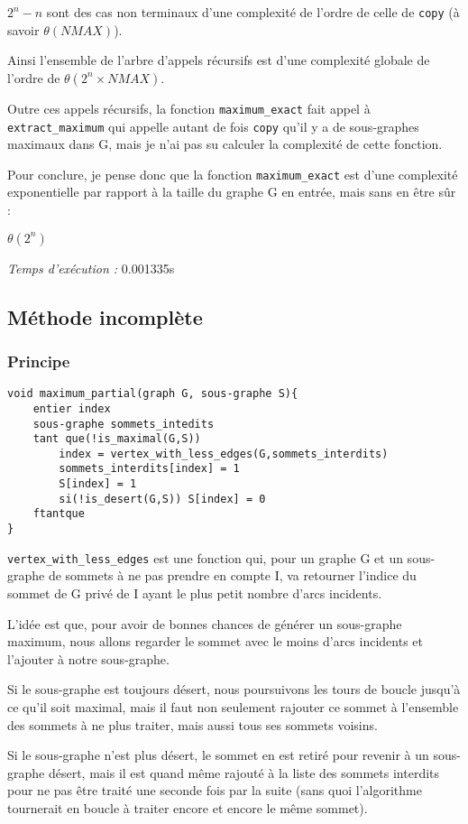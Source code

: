 $2^n-n$ sont des cas non terminaux d'une complexité de l'ordre de celle de \verb|copy| (à savoir $\theta(NMAX)$).

Ainsi l'ensemble de l'arbre d'appels récursifs est d'une complexité globale de l'ordre de $\theta(2^n \times NMAX)$. 

Outre  ces appels récursifs, la fonction \verb|maximum_exact| fait appel à \verb|extract_maximum| qui appelle autant de fois \verb|copy| qu'il y a de sous-graphes maximaux dans G, mais je n'ai pas su calculer la complexité de cette fonction.

Pour conclure, je pense donc que la fonction \verb|maximum_exact| est d'une complexité exponentielle par rapport à la taille du graphe G en entrée, mais sans en être sûr :

$\theta(2^n)$

\emph{Temps d'exécution :} 0.001335s

\subsection{Méthode incomplète}

\subsubsection{Principe}

\begin{verbatim}
void maximum_partial(graph G, sous-graphe S){
    entier index
    sous-graphe sommets_intedits
    tant que(!is_maximal(G,S))
        index = vertex_with_less_edges(G,sommets_interdits)
        sommets_interdits[index] = 1
        S[index] = 1
        si(!is_desert(G,S)) S[index] = 0
    ftantque
}
\end{verbatim}
\verb|vertex_with_less_edges| est une fonction qui, pour un graphe G et un sous-graphe de sommets à ne pas prendre en compte I, va retourner l'indice du sommet de G privé de I ayant le plus petit nombre d'arcs incidents. 

L'idée est que, pour avoir de bonnes chances de générer un sous-graphe maximum, nous allons regarder le sommet avec le moins d'arcs incidents et l'ajouter à notre sous-graphe. 

Si le sous-graphe est toujours désert, nous poursuivons les tours de boucle jusqu'à ce qu'il soit maximal,  mais il faut non seulement rajouter ce sommet à l'ensemble des sommets à ne plus traiter, mais aussi tous ses sommets voisins. 

Si le sous-graphe n'est plus désert, le sommet en est retiré pour revenir à un sous-graphe désert, mais il est quand même rajouté à la liste des sommets interdits pour ne pas être traité une seconde fois par la suite (sans quoi l'algorithme tournerait en boucle à traiter encore et encore le même sommet). 

